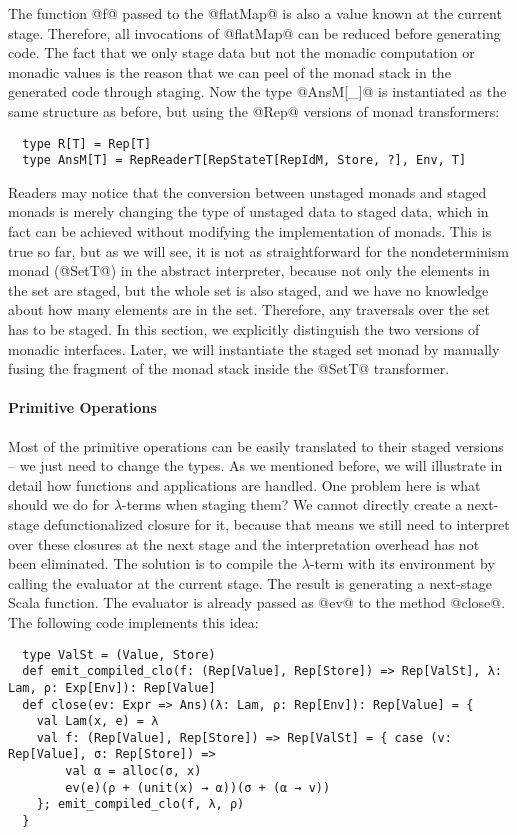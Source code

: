 The function @f@ passed to the @flatMap@ is also a value known at the current stage.
Therefore, all invocations of @flatMap@ can be reduced before generating code.
The fact that we only stage data but not the monadic computation or monadic
values is the reason that we can peel of the monad stack in the generated code
through staging.  Now the type @AnsM[_]@ is instantiated as the same structure
as before, but using the @Rep@ versions of monad transformers:
\begin{lstlisting}
  type R[T] = Rep[T]
  type AnsM[T] = RepReaderT[RepStateT[RepIdM, Store, ?], Env, T]
\end{lstlisting}

Readers may notice that the conversion between unstaged monads and staged monads
is merely changing the type of unstaged data to staged data, which in fact can
be achieved without modifying the implementation of monads. This is true so far,
but as we will see, it is not as straightforward for the nondeterminism monad
(@SetT@) in the abstract interpreter, because not only the elements in the set are
staged, but the whole set is also staged, and we have no knowledge about how
many elements are in the set. Therefore, any traversals over the set has to be
staged.  In this section, we explicitly distinguish the two versions of monadic
interfaces. Later, we will instantiate the staged set monad by manually fusing
the fragment of the monad stack inside the @SetT@ transformer.

\paragraph{Primitive Operations} Most of the primitive operations can be easily
translated to their staged versions -- we just need to change the types.  As we
mentioned before, we will illustrate in detail how functions and applications
are handled.  One problem here is what should we do for $\lambda$-terms when
staging them? We cannot directly create a next-stage defunctionalized closure
for it, because that means we still need to interpret over these closures at the
next stage and the interpretation overhead has not been eliminated. 
The solution is to compile the $\lambda$-term with its environment by calling
the evaluator at the current stage. The result is generating a next-stage
Scala function. The evaluator is already passed as @ev@ to the method @close@.
The following code implements this idea:
\begin{lstlisting}
  type ValSt = (Value, Store)
  def emit_compiled_clo(f: (Rep[Value], Rep[Store]) => Rep[ValSt], λ: Lam, ρ: Exp[Env]): Rep[Value]
  def close(ev: Expr => Ans)(λ: Lam, ρ: Rep[Env]): Rep[Value] = {
    val Lam(x, e) = λ
    val f: (Rep[Value], Rep[Store]) => Rep[ValSt] = { case (v: Rep[Value], σ: Rep[Store]) =>
        val α = alloc(σ, x)
        ev(e)(ρ + (unit(x) → α))(σ + (α → v))
    }; emit_compiled_clo(f, λ, ρ)
  }
\end{lstlisting}

